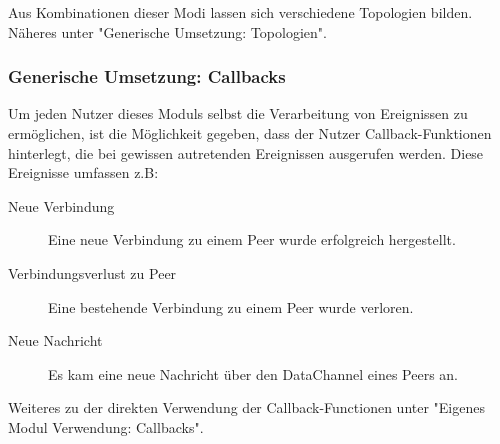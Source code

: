 Aus Kombinationen dieser Modi lassen sich verschiedene Topologien bilden. Näheres unter "Generische Umsetzung: Topologien".



\subsubsection{Generische Umsetzung: Callbacks}
Um jeden Nutzer dieses Moduls selbst die Verarbeitung von Ereignissen zu ermöglichen, ist die Möglichkeit gegeben, dass der Nutzer Callback-Funktionen hinterlegt, die bei gewissen autretenden Ereignissen ausgerufen werden.
Diese Ereignisse umfassen z.B:
\begin{description}
\item[Neue Verbindung]
Eine neue Verbindung zu einem Peer wurde erfolgreich hergestellt.

\item[Verbindungsverlust zu Peer]
Eine bestehende Verbindung zu einem Peer wurde verloren.

\item[Neue Nachricht]
Es kam eine neue Nachricht über den DataChannel eines Peers an.
\end{description}

Weiteres zu der direkten Verwendung der Callback-Functionen unter "Eigenes Modul Verwendung: Callbacks".



